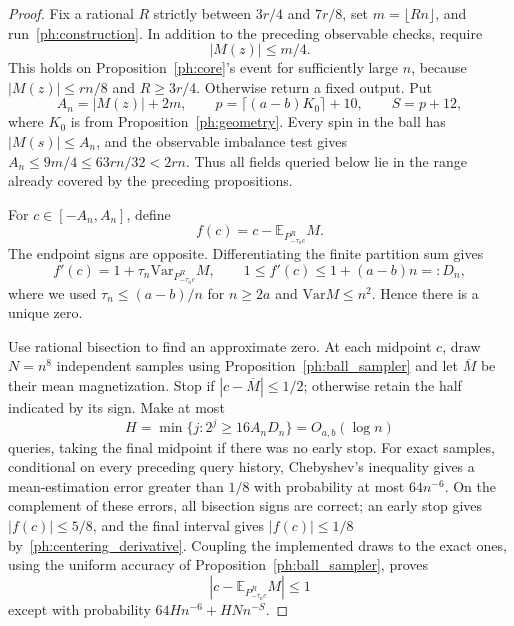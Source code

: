 \documentclass[11pt]{article}
\newcommand{\Var}{\mathrm{Var}}
\def\E{\mathbb{E}}
\numberwithin{equation}{section}
\begin{document}
\begin{proof}
Fix a rational $R$ strictly between $3r/4$ and $7r/8$, set $m=\lfloor Rn\rfloor$, and run~\eqref{ph:construction}. In addition to the preceding observable checks, require
\[
    |M(z)|\le m/4.
\]
This holds on Proposition~\ref{ph:core}'s event for sufficiently large $n$, because $|M(z)|\le rn/8$ and $R\ge3r/4$. Otherwise return a fixed output. Put
\[
 A_n=|M(z)|+2m,\qquad
 p=\lceil(a-b)K_0\rceil+10,\qquad S=p+12,
\]
where $K_0$ is from Proposition~\ref{ph:geometry}. Every spin in the ball has $|M(s)|\le A_n$, and the observable imbalance test gives
$A_n\le9m/4\le63rn/32<2rn$. Thus all fields queried below lie in the range already covered by the preceding propositions.

For $c\in[-A_n,A_n]$, define
\[
    f(c)=c-\E_{P_{-\tau_nc}^R}M.
\]
The endpoint signs are opposite. Differentiating the finite partition sum gives
\begin{equation}\label{ph:centering_derivative}
    f'(c)=1+\tau_n\Var_{P_{-\tau_nc}^R}M,
    \qquad 1\le f'(c)\le1+(a-b)n=:D_n,
\end{equation}
where we used $\tau_n\le(a-b)/n$ for $n\ge2a$ and $\Var M\le n^2$. Hence there is a unique zero.

Use rational bisection to find an approximate zero. At each midpoint $c$, draw $N=n^8$ independent samples using Proposition~\ref{ph:ball_sampler} and let $\overline M$ be their mean magnetization. Stop if $|c-\overline M|\le1/2$; otherwise retain the half indicated by its sign. Make at most
\[
    H=\min\{j:2^j\ge16A_nD_n\}=O_{a,b}(\log n)
\]
queries, taking the final midpoint if there was no early stop. For exact samples, conditional on every preceding query history, Chebyshev's inequality gives a mean-estimation error greater than $1/8$ with probability at most $64n^{-6}$. On the complement of these errors, all bisection signs are correct; an early stop gives $|f(c)|\le5/8$, and the final interval gives $|f(c)|\le1/8$ by~\eqref{ph:centering_derivative}. Coupling the implemented draws to the exact ones, using the uniform accuracy of Proposition~\ref{ph:ball_sampler}, proves
\begin{equation}\label{ph:center_accuracy}
    |c-\E_{P_{-\tau_nc}^R}M|\le1
\end{equation}
except with probability $64Hn^{-6}+HNn^{-S}$.


\end{proof}
\end{document}

